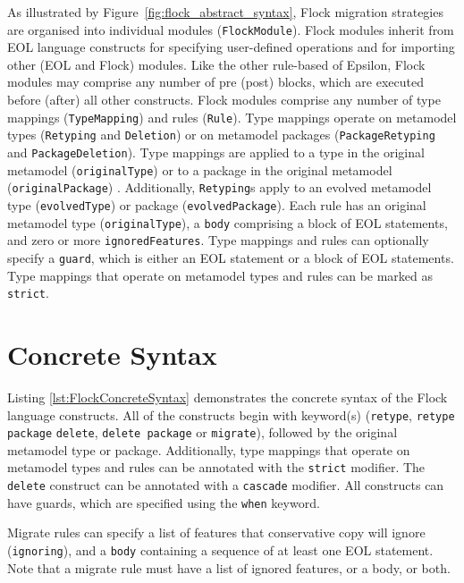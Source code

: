 As illustrated by Figure~\ref{fig:flock_abstract_syntax}, Flock migration strategies are organised into individual modules (\texttt{Flo\-ckMo\-du\-le}). Flock modules inherit from EOL language constructs for specifying user-defined operations and for importing other (EOL and Flock) modules. Like the other rule-based of Epsilon, Flock modules may comprise any number of pre (post) blocks, which are executed before (after) all other constructs. Flock modules comprise any number of type mappings (\texttt{Ty\-peMa\-pp\-i\-ng}) and rules (\texttt{Ru\-le}). Type mappings operate on metamodel types (\texttt{Rety\-pi\-ng} and \texttt{De\-le\-ti\-on}) or on metamodel packages (\texttt{Pa\-ck\-a\-geRety\-pi\-ng} and \texttt{Pa\-ck\-a\-geDe\-le\-ti\-on}). Type mappings are applied to a type in the original metamodel (\texttt{or\-ig\-in\-alTy\-pe}) or to a package in the original metamodel (\texttt{or\-ig\-in\-alPa\-ck\-a\-ge}) . Additionally, \texttt{Rety\-pi\-ng}s apply to an evolved metamodel type (\texttt{ev\-ol\-vedTy\-pe}) or package (\texttt{ev\-ol\-vedPa\-ck\-a\-ge}). Each rule has an original metamodel type (\texttt{or\-ig\-in\-alTy\-pe}), a \texttt{bo\-dy} comprising a block of EOL statements, and zero or more \texttt{ig\-no\-r\-edFe\-at\-ur\-es}. Type mappings and rules can optionally specify a \texttt{gu\-ard}, which is either an EOL statement or a block of EOL statements. Type mappings that operate on metamodel types and rules can be marked as \texttt{str\-ict}.

\section{Concrete Syntax}

Listing \ref{lst:FlockConcreteSyntax} demonstrates the concrete syntax of the Flock language constructs. All of the constructs begin with keyword(s) (\texttt{retype}, \texttt{retype package} \texttt{delete}, \texttt{delete package} or \texttt{migrate}), followed by the original metamodel type or package. Additionally, type mappings that operate on metamodel types and rules can be annotated with the \texttt{strict} modifier. The \texttt{delete} construct can be annotated with a \texttt{cascade} modifier. All constructs can have guards, which are specified using the \texttt{when} keyword.

Migrate rules can specify a list of features that conservative copy will ignore (\texttt{ignoring}), and a \texttt{body} containing a sequence of at least one EOL statement. Note that a migrate rule must have a list of ignored features, or a body, or both.

